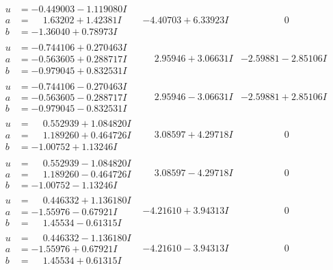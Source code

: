 \documentclass[1p]{elsarticle_modified}
\theoremstyle{definition}
\begin{document}
$$\begin{array}{c|c|c}
\begin{aligned}
u &= -0.449003 - 1.119080 I \\
a &= \phantom{-}1.63202 + 1.42381 I \\
b &= -1.36040 + 0.78973 I\end{aligned}
 & -4.40703 + 6.33923 I & \phantom{-0.000000 } 0 \\ \hline\begin{aligned}
u &= -0.744106 + 0.270463 I \\
a &= -0.563605 + 0.288717 I \\
b &= -0.979045 + 0.832531 I\end{aligned}
 & \phantom{-}2.95946 + 3.06631 I & -2.59881 - 2.85106 I \\ \hline\begin{aligned}
u &= -0.744106 - 0.270463 I \\
a &= -0.563605 - 0.288717 I \\
b &= -0.979045 - 0.832531 I\end{aligned}
 & \phantom{-}2.95946 - 3.06631 I & -2.59881 + 2.85106 I \\ \hline\begin{aligned}
u &= \phantom{-}0.552939 + 1.084820 I \\
a &= \phantom{-}1.189260 + 0.464726 I \\
b &= -1.00752 + 1.13246 I\end{aligned}
 & \phantom{-}3.08597 + 4.29718 I & \phantom{-0.000000 } 0 \\ \hline\begin{aligned}
u &= \phantom{-}0.552939 - 1.084820 I \\
a &= \phantom{-}1.189260 - 0.464726 I \\
b &= -1.00752 - 1.13246 I\end{aligned}
 & \phantom{-}3.08597 - 4.29718 I & \phantom{-0.000000 } 0 \\ \hline\begin{aligned}
u &= \phantom{-}0.446332 + 1.136180 I \\
a &= -1.55976 - 0.67921 I \\
b &= \phantom{-}1.45534 - 0.61315 I\end{aligned}
 & -4.21610 + 3.94313 I & \phantom{-0.000000 } 0 \\ \hline\begin{aligned}
u &= \phantom{-}0.446332 - 1.136180 I \\
a &= -1.55976 + 0.67921 I \\
b &= \phantom{-}1.45534 + 0.61315 I\end{aligned}
 & -4.21610 - 3.94313 I & \phantom{-0.000000 } 0 \\ \hline\begin{aligned}

\end{aligned}
\end{array}$$
\end{document}
